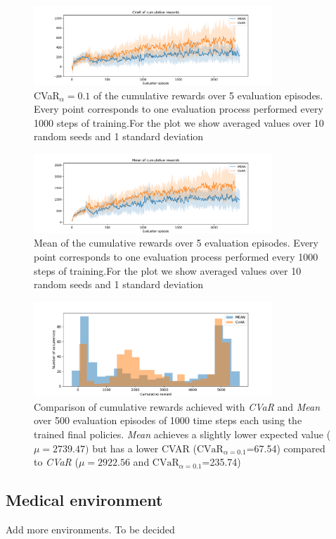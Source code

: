 \begin{figure}[ht]
    \centering
    \includegraphics[width=0.8\textwidth]{images/Walker_offpolicy_expert/cvar_train_withstds.pdf}
    \caption{CVaR$_\alpha=0.1$ of the cumulative rewards over 5 evaluation episodes.
    Every point corresponds to one evaluation process performed every 1000 steps of training.For the plot we
    show averaged values over 10 random seeds and 1 standard deviation}
    \label{fig:cvar_walker}

\end{figure}

\begin{figure}[ht]
\centering
\includegraphics[width=0.8\textwidth]{images/Walker_offpolicy_expert/mean_train_withstds.pdf}
\caption{Mean of the cumulative rewards over 5 evaluation episodes. Every point corresponds
to one evaluation process performed every 1000 steps of training.For the plot we
show averaged values over 10 random seeds and 1 standard deviation}
\label{fig:mean_walker}

\end{figure}



\begin{figure}[ht]
\centering
\includegraphics[width=0.8\textwidth]{images/Walker_offpolicy_expert/hist_evaluation_numevalsteps1000.pdf}
\caption{Comparison of cumulative rewards achieved with \textit{CVaR} and \textit{Mean}
over 500 evaluation episodes of 1000 time steps each using the trained final policies.
\textit{Mean} achieves a slightly lower expected value ($\mu=2739.47)$ but 
has a lower CVAR ($\text{CVaR}_{\alpha= 0.1}$=67.54) compared to
\textit{CVaR} ($\mu=2922.56$ and $\text{CVaR}_{\alpha= 0.1}$=235.74)}
\label{fig:hist_cum_rewards_walker}
\end{figure}

\clearpage
\subsection{Medical environment}
Add more environments. To be decided